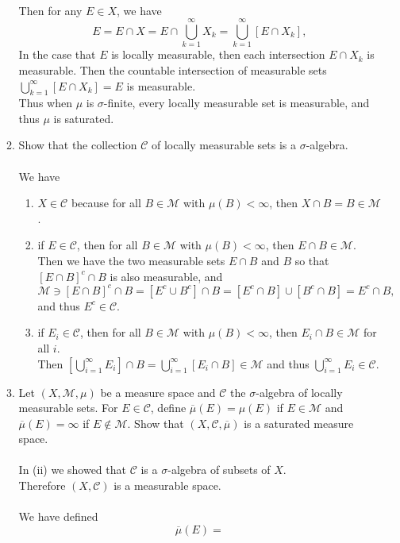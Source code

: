 \begin{enumerate}
\begin{enumerate}[label=(\roman*),align=left]
		\\Then for any $E\in X$, we have 
		\[
			E=E\cap X = E\cap \bigcup_{k=1}^\infty X_k = \bigcup_{k=1}^\infty[E\cap X_k],
		\]
		In the case that $E$ is locally measurable, then each intersection $E\cap X_k$ is measurable.
		Then the countable intersection of measurable sets $\bigcup_{k=1}^\infty[E\cap X_k]=E$ is measurable.
		\\Thus when $\mu$ is $\sigma$-finite, every locally measurable set is measurable, and thus $\mu$ is saturated.
		\item Show that the collection $\mathcal{C}$ of locally measurable sets is a $\sigma$-algebra.\\
		\\We have
		\begin{enumerate}[label=(\roman*),align=left]   
			\item $X\in\mathcal{C}$ because for all $B\in\mathcal{M}$ with $\mu(B)<\infty$, then $X\cap B=B\in\mathcal{M}$.
			\item if $E\in\mathcal{C}$, then for all $B\in\mathcal{M}$ with $\mu(B)<\infty$, then $E\cap B\in\mathcal{M}$.\\
			Then we have the two measurable sets $E\cap B$ and $B$ so that $[E\cap B]^c\cap B$ is also measurable, and
			\[
				\mathcal{M}\ni[E\cap B]^c\cap B=[E^c\cup B^c]\cap B=[E^c\cap B]\cup[B^c\cap B]=E^c\cap B,
			\]
			and thus $E^c\in\mathcal{C}$. 
			\item if $E_i\in\mathcal{C}$, then for all $B\in\mathcal{M}$ with $\mu(B)<\infty$, then $E_i\cap B\in\mathcal{M}$ for all $i$.\\
			Then $\left[\bigcup_{i=1}^\infty E_i\right]\cap B=\bigcup_{i=1}^\infty [E_i\cap B]\in\mathcal{M}$ and thus $\bigcup_{i=1}^\infty E_i\in\mathcal{C}$.
		\end{enumerate}
		\item Let $(X,\mathcal{M},\mu)$ be a measure space and $\mathcal{C}$ the $\sigma$-algebra of locally measurable sets.
		For $E\in\mathcal{C}$, define $\overline\mu(E)=\mu(E)$ if $E\in\mathcal{M}$ and $\overline\mu(E)=\infty$ if $E\notin\mathcal{M}$.
		Show that $(X,\mathcal{C},\overline\mu)$ is a saturated measure space.\\
		\\In (ii) we showed that $\mathcal{C}$ is a $\sigma$-algebra of subsets of $X$.\\
		Therefore $(X,\mathcal{C})$ is a measurable space.\\
		\\We have defined
		\[
			\overline\mu(E)=
\]
\end{enumerate}
\end{enumerate}
